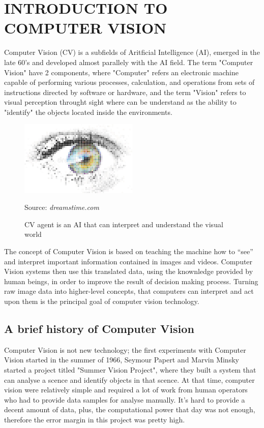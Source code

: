 \documentclass[12pt]{article}
\newcommand{\source}[1]{\caption*{Source: \emph{#1}} }
\begin{document}

\section{INTRODUCTION TO COMPUTER VISION}
Computer Vision (CV) is a subfields of Aritficial Intelligence (AI), emerged in the
late 60’s and developed almost parallely with the AI field. 
The term "Computer Vision" have 2 components, where "Computer" refers an electronic 
machine capable of performing various processes, calculation, and operations from 
sets of instructions directed by software or hardware, and the term "Vision" refers
to visual perception throught sight where can be understand as the ability to "identify"
the objects located inside the environments. 

\begin{figure}[htp]
    \centering
    \includegraphics[width=0.5\textwidth]{images/digital-eyes.jpg}
    \caption{CV agent is an AI that can interpret and understand the visual world}
    \label{fig:computer_vision}
    \source{dreamstime.com}
\end{figure}

The concept of Computer Vision is based on teaching the machine how to “see” and 
interpret important information contained in images and videos. Computer Vision 
systems then use this translated data, 
using the knownledge provided by human beings, in order to improve the result of 
decision making process. Turning raw image data into higher-level concepts, that 
computers can interpret and act upon them is the principal goal of computer vision 
technology. 

\subsection{A brief history of Computer Vision}
Computer Vision is not new technology; the first experiments with Computer Vision 
started in the summer of 1966, Seymour Papert and Marvin Minsky started a project titled 
"Summer Vision Project"\cite{summervision}, where they built a system that can analyse 
a scence and identify objects in that scence. At that time, computer vision were relatively
simple and required a lot of work from human operators who had to provide data samples 
for analyse manually. It's hard to provide a decent amount of data, plus, the computational
power that day was not enough, therefore the error margin in this project was pretty high. 
\end{document}
